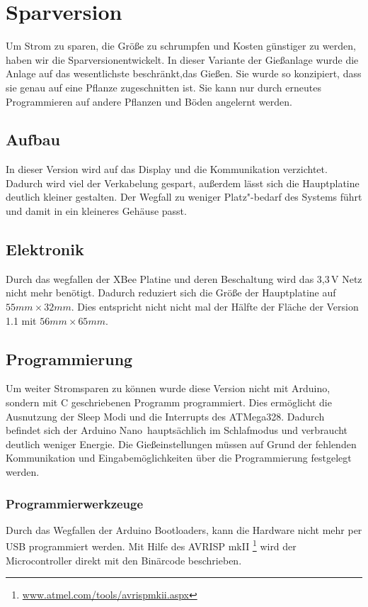 
\section{Sparversion}
	Um Strom zu sparen, die Größe zu schrumpfen und Kosten günstiger zu werden, haben wir die \glqq Sparversion\grqq entwickelt.
	In dieser Variante der Gießanlage wurde die Anlage auf das wesentlichste beschränkt,das Gießen.
	Sie wurde so konzipiert, dass sie genau auf eine Pflanze zugeschnitten ist.
	Sie kann nur durch erneutes Programmieren auf andere Pflanzen und Böden angelernt werden. 	
	\subsection{Aufbau}
	In dieser Version wird auf das Display und die Kommunikation verzichtet.
	Dadurch wird viel der Verkabelung gespart, außerdem lässt sich die Hauptplatine deutlich kleiner gestalten.
	Der Wegfall zu weniger Platz"-bedarf des Systems führt und damit in ein kleineres Gehäuse passt.
	\subsection{Elektronik}
	Durch das wegfallen der XBee Platine und deren Beschaltung wird das 3,3\,V Netz nicht mehr benötigt.
	Dadurch reduziert sich die Größe der Hauptplatine auf \begin{math} 55 mm \times 32 mm \end{math}.
	Dies entspricht nicht nicht mal der Hälfte der Fläche der Version 1.1 mit \begin{math} 56 mm \times 65 mm \end{math}.
	\subsection{Programmierung}
	Um weiter Stromsparen zu können wurde diese Version nicht mit Arduino, sondern mit C geschriebenen Programm programmiert.
	Dies ermöglicht die Ausnutzung der Sleep Modi und die Interrupts des ATMega328. 
	Dadurch befindet sich der \glqq Arduino Nano\grqq \ hauptsächlich im Schlafmodus und verbraucht deutlich weniger Energie.
	Die Gießeinstellungen müssen auf Grund der fehlenden Kommunikation und Eingabemöglichkeiten über die Programmierung festgelegt werden.
	\subsubsection{Programmierwerkzeuge}
	Durch das Wegfallen der Arduino Bootloaders, kann die Hardware nicht mehr per USB programmiert werden. 
	Mit Hilfe des AVRISP mkII \footnote{\href{http://www.atmel.com/tools/avrispmkii.aspx}{www.atmel.com/tools/avrispmkii.aspx}} wird der Microcontroller direkt mit den Binärcode beschrieben.
